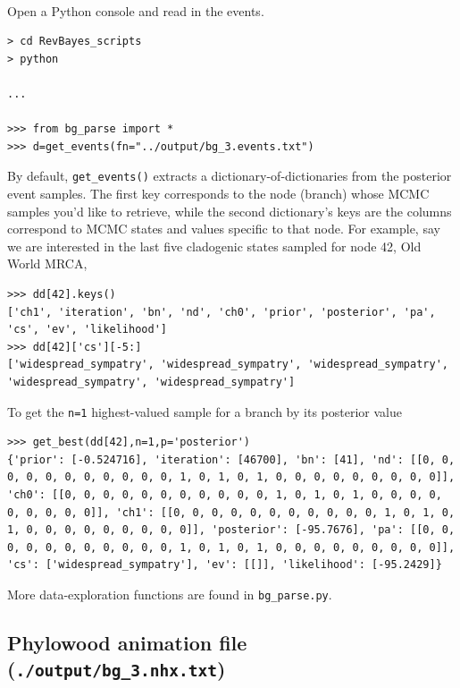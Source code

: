 \noindent \\ \impmark  Open a Python console and read in the events.

\begin{snugshade}
\begin{lstlisting}
> cd RevBayes_scripts
> python

...

>>> from bg_parse import *
>>> d=get_events(fn="../output/bg_3.events.txt")
\end{lstlisting}
\end{snugshade}

By default, {\tt get\_events()} extracts a dictionary-of-dictionaries from the posterior event samples.
The first key corresponds to the node (branch) whose MCMC samples you'd like to retrieve, while the second dictionary's keys are the columns correspond to MCMC states and values specific to that node. For example, say we are interested in the last five cladogenic states sampled for node 42, Old World MRCA,
\begin{snugshade}
\begin{lstlisting}
>>> dd[42].keys()
['ch1', 'iteration', 'bn', 'nd', 'ch0', 'prior', 'posterior', 'pa', 'cs', 'ev', 'likelihood']
>>> dd[42]['cs'][-5:]
['widespread_sympatry', 'widespread_sympatry', 'widespread_sympatry', 'widespread_sympatry', 'widespread_sympatry']
\end{lstlisting}
\end{snugshade}

To get the {\tt n=1} highest-valued sample for a branch by its posterior value
\begin{snugshade}
\begin{lstlisting}
>>> get_best(dd[42],n=1,p='posterior')
{'prior': [-0.524716], 'iteration': [46700], 'bn': [41], 'nd': [[0, 0, 0, 0, 0, 0, 0, 0, 0, 0, 0, 1, 0, 1, 0, 1, 0, 0, 0, 0, 0, 0, 0, 0, 0]], 'ch0': [[0, 0, 0, 0, 0, 0, 0, 0, 0, 0, 0, 1, 0, 1, 0, 1, 0, 0, 0, 0, 0, 0, 0, 0, 0]], 'ch1': [[0, 0, 0, 0, 0, 0, 0, 0, 0, 0, 0, 1, 0, 1, 0, 1, 0, 0, 0, 0, 0, 0, 0, 0, 0]], 'posterior': [-95.7676], 'pa': [[0, 0, 0, 0, 0, 0, 0, 0, 0, 0, 0, 1, 0, 1, 0, 1, 0, 0, 0, 0, 0, 0, 0, 0, 0]], 'cs': ['widespread_sympatry'], 'ev': [[]], 'likelihood': [-95.2429]}
\end{lstlisting}
\end{snugshade}

More data-exploration functions are found in {\tt bg\_parse.py}.

\subsection{Phylowood animation file (\texttt{./output/bg\_3.nhx.txt})}

